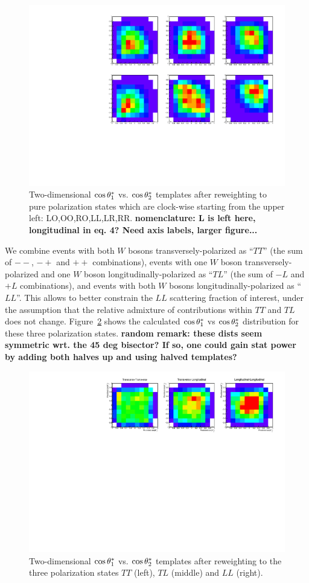 \begin{figure}
\includegraphics[width=.49\textwidth]{./fig/2D_temps.pdf}
\caption{\label{fig:2D_polarization_six}Two-dimensional $ \cos \theta^{*}  _1$
  vs. $ \cos \theta^{*}  _2$ templates after reweighting to pure polarization states
  which are clock-wise starting from the upper left:
  LO,OO,RO,LL,LR,RR. {\bf nomenclature: L is left here, longitudinal
    in eq. 4? Need axis labels, larger figure...}}
\end{figure}
 

We combine events with both $W$ bosons transversely-polarized as
``$TT$'' (the sum of $--$, $-+$ and $++$ combinations), events with
one $W$ boson transversely-polarized and one $W$ boson
longitudinally-polarized as ``$TL$'' (the sum of $-L$ and $+L$
combinations), and events with both $W$ bosons
longitudinally-polarized as ``$LL$''. This allows to better constrain
the $LL$ scattering fraction of interest, under the assumption that
the relative admixture of contributions within $TT$ and $TL$ does not
change. Figure~\ref{fig:2D_polarization_three} shows the calculated
$ \cos \theta^{*}  _1$ vs $ \cos \theta^{*}  _2$ distribution for these three polarization states.
{\bf random remark: these dists seem symmetric wrt. the 45 deg
  bisector?  If so, one could gain stat power by adding both halves up
  and using halved templates?}

\begin{figure}
\includegraphics[width=.49\textwidth]{./fig/templates.pdf}
\caption{\label{fig:2D_polarization_three}Two-dimensional $ \cos \theta^{*}  _1$ vs.
  $ \cos \theta^{*}  _2$ templates after reweighting to the three polarization
  states $TT$ (left), $TL$ (middle) and $LL$ (right).}
\end{figure}

